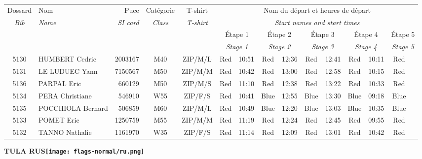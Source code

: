 \documentclass{report}
\begin{document}
  \begin{longtable}{|c|l|r|c|c|*{5}{cc|}}
    Dossard & Nom  & Puce    & Catégorie & T-shirt & \multicolumn{10}{c|}{Nom du départ et heures de départ} \\
    \itshape Bib     & \itshape Name & \itshape SI card & \itshape Class  & \itshape  T-shirt  & \multicolumn{10}{c|}{\itshape Start names and start times} \\
    \hline
    & & & & & \multicolumn{2}{c|}{Étape 1} & \multicolumn{2}{c|}{Étape 2} & \multicolumn{2}{c|}{Étape 3} & \multicolumn{2}{c|}{Étape 4} & \multicolumn{2}{c|}{Étape 5} \\
    & & & & & \multicolumn{2}{c|}{\itshape Stage 1} & \multicolumn{2}{c|}{\itshape Stage 2} & \multicolumn{2}{c|}{\itshape Stage 3} & \multicolumn{2}{c|}{\itshape Stage 4} & \multicolumn{2}{c|}{\itshape Stage 5} \\
    \hline
    5130 & HUMBERT Cedric & 2003167 & M40 & ZIP/M/L & Red & 10:51 & Red & 12:36 & Red & 12:41 & Red & 10:11 & Red &  \\
    5131 & LE LUDUEC Yann & 7150567 & M50 & ZIP/M/M & Red & 10:42 & Red & 13:00 & Red & 12:58 & Red & 10:15 & Red &  \\
    5136 & PARPAL Eric & 660129 & M50 & ZIP/M/S & Red & 11:10 & Red & 12:38 & Red & 13:22 & Red & 10:33 & Red &  \\
    5134 & PERA Christiane & 546910 & W55 & ZIP/F/S & Red & 10:41 & Blue & 12:55 & Blue & 13:30 & Blue & 09:18 & Blue &  \\
    5135 & POCCHIOLA Bernard & 506859 & M60 & ZIP/M/L & Red & 10:49 & Blue & 12:20 & Blue & 13:03 & Blue & 10:35 & Blue &  \\
    5133 & POMET Eric & 1250759 & M55 & ZIP/M/M & Red & 11:19 & Red & 12:24 & Red & 12:45 & Red & 09:55 & Red &  \\
    5132 & TANNO Nathalie & 1161970 & W35 & ZIP/F/S & Red & 11:14 & Red & 12:09 & Red & 13:01 & Red & 10:42 & Red &  \\
  \end{longtable}
\newpage
  \Huge \centering \bfseries TULA  RUS\normalfont \footnotesize \sffamily \hfill \texttt{[image: flags-normal/ru.png]} \newline 
\end{document}
